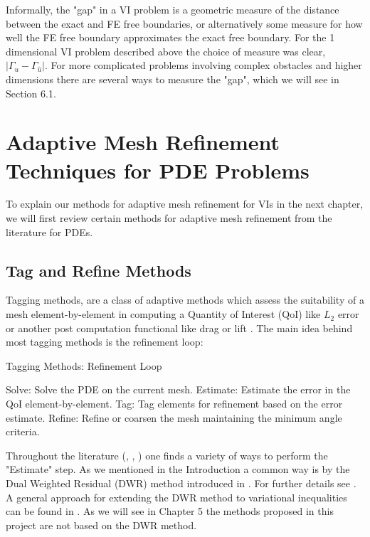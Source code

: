 \documentclass[12 pt]{report}
\newcommand{\abs}[1]{\left| #1 \right|}
\begin{document}
Informally, the "gap" in a VI problem is a geometric measure of the distance between the exact and FE free boundaries, or alternatively some measure for how well the FE free boundary approximates the exact free boundary. For the 1 dimensional VI problem described above the choice of measure was clear, $\abs{\Gamma_u - \Gamma_{\hat{u}}}$. For more complicated problems involving complex obstacles and higher dimensions there are several ways to measure the "gap", which we will see in Section 6.1.



\chapter{Adaptive Mesh Refinement Techniques for PDE Problems}

To explain our methods for adaptive mesh refinement for VIs in the next chapter, we will first review certain methods for adaptive mesh refinement from the literature for PDEs.

\section{Tag and Refine Methods}

Tagging methods, are a class of adaptive methods which assess the suitability of a mesh element-by-element in computing a Quantity of Interest (QoI) like $L_2$ error or another post computation functional like drag or lift \cite{bangerth_adaptive_2003}. The main idea behind most tagging methods is the refinement loop:

\begin{algorithm}
  \caption{Tagging Methods: Refinement Loop}
  \begin{algorithmic}
    \State Solve: Solve the PDE on the current mesh. 
    \State Estimate: Estimate the error in the QoI element-by-element.
    \State Tag: Tag elements for refinement based on the error estimate.
    \State Refine: Refine or coarsen the mesh maintaining the minimum angle criteria.
  \end{algorithmic}
\end{algorithm}


Throughout the literature (\citet{becker_feed-back_1996}, \citet{bangerth_adaptive_2003}, \citet{suttmeier_numerical_2008}) one finds a variety of ways to perform the "Estimate" step. As we mentioned in the Introduction a common way is by the Dual Weighted Residual (DWR) method introduced in \citet{becker_feed-back_1996}. For further details see \citet[Chapter 3]{bangerth_adaptive_2003}. A general approach for extending the DWR method to variational inequalities can be found in \citet{suttmeier_numerical_2008}. As we will see in Chapter 5 the methods proposed in this project are not based on the DWR method. 
\end{document}

